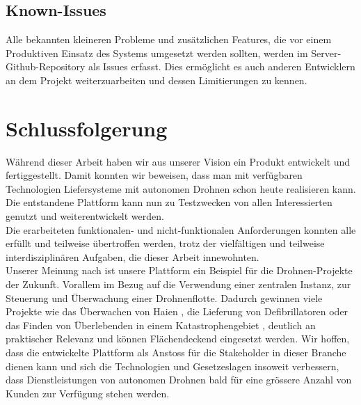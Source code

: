 \subsection{Known-Issues}

Alle bekannten kleineren Probleme und zusätzlichen Features, die vor einem Produktiven Einsatz des Systems umgesetzt werden sollten, werden im Server-Github-Repository als Issues erfasst. Dies ermöglicht es auch anderen Entwicklern an dem Projekt weiterzuarbeiten und dessen Limitierungen zu kennen.


\section{Schlussfolgerung}

Während dieser Arbeit haben wir aus unserer Vision ein Produkt entwickelt und fertiggestellt. Damit konnten wir beweisen, dass man mit verfügbaren Technologien Liefersysteme mit autonomen Drohnen schon heute realisieren kann. Die entstandene Plattform kann nun zu Testzwecken von allen Interessierten genutzt und weiterentwickelt werden.\\

Die erarbeiteten funktionalen- und nicht-funktionalen Anforderungen konnten alle erfüllt und teilweise übertroffen werden, trotz der vielfältigen und teilweise interdisziplinären Aufgaben, die dieser Arbeit innewohnten. \\

Unserer Meinung nach ist unsere Plattform ein Beispiel für die Drohnen-Projekte der Zukunft. Vorallem im Bezug auf die Verwendung einer zentralen Instanz, zur Steuerung und Überwachung einer Drohnenflotte. Dadurch gewinnen viele Projekte wie das Überwachen von Haien \cite{shark}, die Lieferung von Defibrillatoren \cite{defibrillator-drone} oder das Finden von Überlebenden in einem Katastrophengebiet \cite{catastrophic-drone}, deutlich an praktischer Relevanz und können Flächendeckend eingesetzt werden. Wir hoffen, dass die entwickelte Plattform als Anstoss für die Stakeholder in dieser Branche dienen kann und sich die Technologien und Gesetzeslagen insoweit verbessern, dass Dienstleistungen von autonomen Drohnen bald für eine grössere Anzahl von Kunden zur Verfügung stehen werden.





